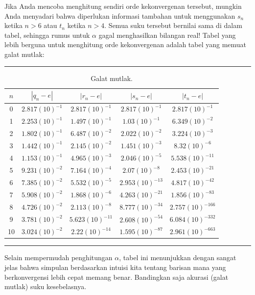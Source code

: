 Jika Anda mencoba menghitung sendiri orde kekonvergenan tersebut,
mungkin Anda menyadari bahwa diperlukan informasi tambahan untuk menggunakan
$s_{n}$ ketika $n>6$ atau $t_{n}$ ketika $n>4$. Semua suku tersebut
bernilai sama di dalam tabel, sehingga rumus untuk $\alpha$ gagal
menghasilkan bilangan real! Tabel yang lebih berguna untuk menghitung
orde kekonvergenan adalah tabel yang memuat galat mutlak: 
\begin{table}[h]
\hrule \caption{\label{tab:absoluteErrors}Galat mutlak.}
\medskip{}

\centering{}%
\begin{tabular}{c|cccc}
$n$ & $|q_{n}-e|$ & $|r_{n}-e|$ & $|s_{n}-e|$ & $|t_{n}-e|$\tabularnewline
\hline 
0 & $2.817(10)^{-1}$ & $2.817(10)^{-1}$ & $2.817(10)^{-1}$ & $2.817(10)^{-1}$\tabularnewline
1 & $2.253(10)^{-1}$ & $1.497(10)^{-1}$ & $1.03(10)^{-1}$ & $6.349(10)^{-2}$\tabularnewline
2 & $1.802(10)^{-1}$ & $6.487(10)^{-2}$ & $2.022(10)^{-2}$ & $3.224(10)^{-3}$\tabularnewline
3 & $1.442(10)^{-1}$ & $2.145(10)^{-2}$ & $1.451(10)^{-3}$ & $8.32(10)^{-6}$\tabularnewline
4 & $1.153(10)^{-1}$ & $4.965(10)^{-3}$ & $2.046(10)^{-5}$ & $5.538(10)^{-11}$\tabularnewline
5 & $9.231(10)^{-2}$ & $7.164(10)^{-4}$ & $2.07(10)^{-8}$ & $2.453(10)^{-21}$\tabularnewline
6 & $7.385(10)^{-2}$ & $5.532(10)^{-5}$ & $2.953(10)^{-13}$ & $4.817(10)^{-42}$\tabularnewline
7 & $5.908(10)^{-2}$ & $1.868(10)^{-6}$ & $4.263(10)^{-21}$ & $1.856(10)^{-83}$\tabularnewline
8 & $4.726(10)^{-2}$ & $2.113(10)^{-8}$ & $8.777(10)^{-34}$ & $2.757(10)^{-166}$\tabularnewline
9 & $3.781(10)^{-2}$ & $5.623(10)^{-11}$ & $2.608(10)^{-54}$ & $6.084(10)^{-332}$\tabularnewline
10 & $3.024(10)^{-2}$ & $2.22(10)^{-14}$ & $1.595(10)^{-87}$ & $2.961(10)^{-663}$\tabularnewline
\end{tabular}\medskip{}
\hrule 
\end{table}
 Selain mempermudah penghitungan $\alpha$, tabel ini menunjukkan
dengan sangat jelas bahwa simpulan berdasarkan intuisi kita tentang
barisan mana yang berkonvergensi lebih cepat memang benar. Bandingkan
saja akurasi (galat mutlak) suku kesebelasnya. 

